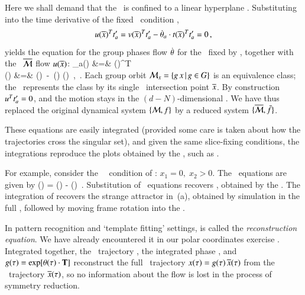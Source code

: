 \documentclass[preprint,number,sort&compress]{elsarticle}
\begin{document}
Here we shall demand that the \reducedsp\ is confined to a
linear hyperplane \slice. Substituting  into the
time derivative of the fixed \slice\ condition
,
\[
u(\overline{x})^T t'_{a} =
v(\overline{x})^T t'_{a} -
\dot{{\bf \theta}}_a \cdot
t(\overline{x})^T  t'_{a}
= 0
    \,,
\]
yields the equation for the group phases flow $\dot{{\bf \theta}}$
for the \slice\ fixed by \slicep, together with the
\reducedsp\ $\overline{\cal M}$  flow $u(\overline{x})$:
\bea
\dot{\gSpace}_a(\sspRed) &=& 
                       {\groupTan(\sspRed)^T \cdot \sliceTan{} }
\label{MFdtheta}\\
\velRed(\sspRed) &=& \vel(\sspRed)
                    \,-\, \dot{\gSpace}(\sspRed)  \cdot \groupTan(\sspRed)
    \,,\qquad\quad \sspRed \in \pSRed
\,.
\label{EqMotMFrame}
\eea
Each group orbit ${\cal M}_{x} = \{  g \, x \,|\, g
\in G \}$ is an equivalence class; the \mslices\ represents
the class by its single \slice\ intersection point $\overline{x}$.
By construction $u^T t'_{a} = 0$, and  the motion
stays in the $(d\!-\!N)$-dim\-ens\-ion\-al \slice. We have
thus replaced the original dynamical system $\{{\cal M},f\}$ by a
reduced system $\{\overline{\cal M},\bar{f}\}$.

These equations are easily integrated (provided some care is
taken about how the trajectories cross the singular set), and
given the same slice-fixing conditions, the integrations reproduce
the plots obtained by the \mframes, such as .

For example, consider the \cLe\ \slice\ condition of
: $x_1=0,\;x_2>0$. The \reducedsp\
equations are given by
\beq
\velRed(\sspRed) =
   \vel(\sspRed) -  \groupTan(\sspRed)
\,.
Substitution of \cLe\ equations recovers ,
obtained by the \mframes. The integration of
\refeq{eq:rdcdCLeR} recovers the strange attractor in
\,(a), obtained by simulation in the full
\statesp, followed by moving frame rotation into the \slice.

In pattern recognition and `template fitting' settings,
 is called the {\em reconstruction equation}.
We have already encountered it in our polar coordinates
exercise . Integrated together, the
\reducedsp\ trajectory , the integrated
phase , and $g(\tau)=\exp[{\bf \theta}(\tau)
\cdot \mathbf{T}]$ reconstruct the full \statesp\ trajectory
$x(\tau)= g(\tau)\,\overline{x}(\tau)$ from the
\reducedsp\  trajectory $\overline{x}(\tau)$, so no information
about the flow is lost in the process of symmetry reduction.
\end{document}
